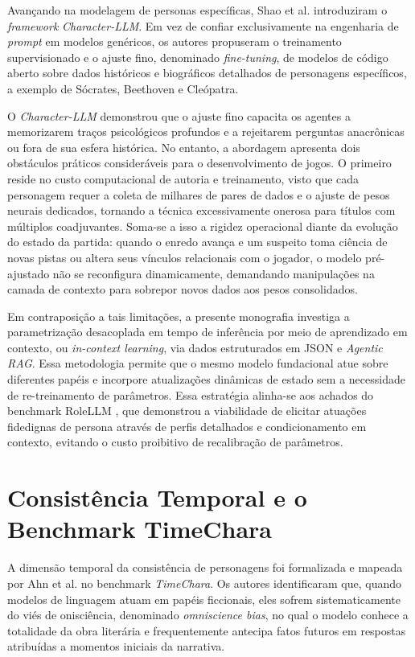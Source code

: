 Avançando na modelagem de personas específicas, Shao et al. \cite{shao2023character} introduziram o \textit{framework} \textit{Character-LLM}. Em vez de confiar exclusivamente na engenharia de \textit{prompt} em modelos genéricos, os autores propuseram o treinamento supervisionado e o ajuste fino, denominado \textit{fine-tuning}, de modelos de código aberto sobre dados históricos e biográficos detalhados de personagens específicos, a exemplo de Sócrates, Beethoven e Cleópatra.

O \textit{Character-LLM} demonstrou que o ajuste fino capacita os agentes a memorizarem traços psicológicos profundos e a rejeitarem perguntas anacrônicas ou fora de sua esfera histórica. No entanto, a abordagem apresenta dois obstáculos práticos consideráveis para o desenvolvimento de jogos. O primeiro reside no custo computacional de autoria e treinamento, visto que cada personagem requer a coleta de milhares de pares de dados e o ajuste de pesos neurais dedicados, tornando a técnica excessivamente onerosa para títulos com múltiplos coadjuvantes. Soma-se a isso a rigidez operacional diante da evolução do estado da partida: quando o enredo avança e um suspeito toma ciência de novas pistas ou altera seus vínculos relacionais com o jogador, o modelo pré-ajustado não se reconfigura dinamicamente, demandando manipulações na camada de contexto para sobrepor novos dados aos pesos consolidados.

Em contraposição a tais limitações, a presente monografia investiga a parametrização desacoplada em tempo de inferência por meio de aprendizado em contexto, ou \textit{in-context learning}, via dados estruturados em JSON e \textit{Agentic RAG}. Essa metodologia permite que o mesmo modelo fundacional atue sobre diferentes papéis e incorpore atualizações dinâmicas de estado sem a necessidade de re-treinamento de parâmetros. Essa estratégia alinha-se aos achados do benchmark RoleLLM \cite{wang2024rolellm}, que demonstrou a viabilidade de elicitar atuações fidedignas de persona através de perfis detalhados e condicionamento em contexto, evitando o custo proibitivo de recalibração de parâmetros.

\section{Consistência Temporal e o Benchmark TimeChara}
\label{sec:rel_ahn}

A dimensão temporal da consistência de personagens foi formalizada e mapeada por Ahn et al. \cite{ahn2024timechara} no benchmark \textit{TimeChara}. Os autores identificaram que, quando modelos de linguagem atuam em papéis ficcionais, eles sofrem sistematicamente do viés de onisciência, denominado \textit{omniscience bias}, no qual o modelo conhece a totalidade da obra literária e frequentemente antecipa fatos futuros em respostas atribuídas a momentos iniciais da narrativa.

